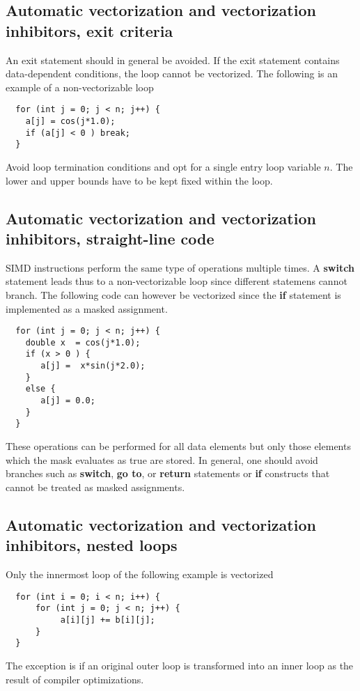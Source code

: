 \documentclass[%
oneside,                 %
final,                   %
10pt]{article}
\begin{document}
\subsection*{Automatic vectorization and vectorization inhibitors, exit criteria}

An exit statement should in general be avoided. 
If the exit statement contains data-dependent conditions, the loop cannot be vectorized. 
The following is an example of a non-vectorizable loop
\begin{verbatim}
  for (int j = 0; j < n; j++) {
    a[j] = cos(j*1.0);
    if (a[j] < 0 ) break;
  }
\end{verbatim}
Avoid loop termination conditions and opt for a single entry loop variable $n$. The lower and upper bounds have to be kept fixed within the loop. 

\subsection*{Automatic vectorization and vectorization inhibitors, straight-line code}

SIMD instructions perform the same type of operations multiple times. 
A \textbf{switch} statement leads thus to a non-vectorizable loop since different statemens cannot branch.
The following code can however be vectorized since the \textbf{if} statement is implemented as a masked assignment.
\begin{verbatim}
  for (int j = 0; j < n; j++) {
    double x  = cos(j*1.0);
    if (x > 0 ) {
       a[j] =  x*sin(j*2.0); 
    }
    else {
       a[j] = 0.0;
    }
  }
\end{verbatim}
These operations can be performed for all data elements but only those elements which the mask evaluates as true are stored. In general, one should avoid branches such as \textbf{switch}, \textbf{go to}, or \textbf{return} statements or \textbf{if} constructs that cannot be treated as masked assignments. 


\subsection*{Automatic vectorization and vectorization inhibitors, nested loops}

Only the innermost loop of the following example is vectorized
\begin{verbatim}
  for (int i = 0; i < n; i++) {
      for (int j = 0; j < n; j++) {
           a[i][j] += b[i][j];
      }  
  }
\end{verbatim}
The exception is if an original outer loop is transformed into an inner loop as the result of compiler optimizations.
\end{document}
